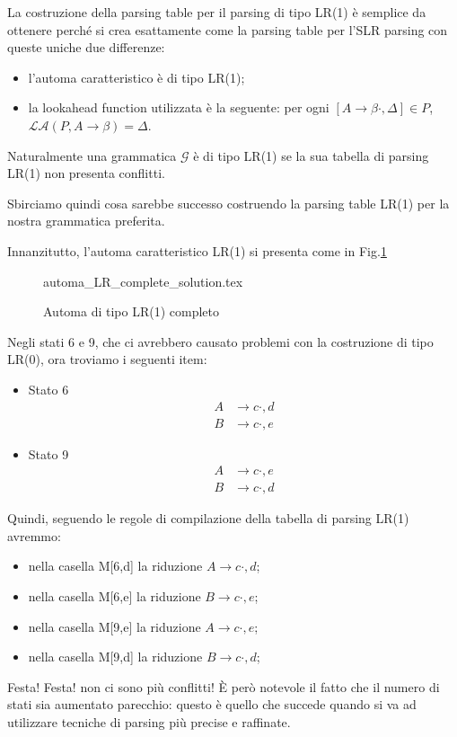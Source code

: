\documentclass[class=book, crop=false, oneside, 12pt]{standalone}
\begin{document}
La costruzione della parsing table per il parsing di tipo LR(1) è semplice da ottenere perché si crea esattamente come la parsing table per l'SLR parsing con queste uniche due differenze:
\begin{itemize}
    \item l'automa caratteristico è di tipo LR(1);
    \item la lookahead function utilizzata è la seguente: per ogni \([A \to \beta \cdot , \Delta] \in P\), \(\mathcal{LA}(P, A \to \beta ) = \Delta\).
\end{itemize}
Naturalmente una grammatica \(\mathcal{G}\) è di tipo LR(1) se la sua tabella di parsing LR(1) non presenta conflitti.

Sbirciamo quindi cosa sarebbe successo costruendo la parsing table LR(1) per la nostra grammatica preferita.

Innanzitutto, l'automa caratteristico LR(1) si presenta come in Fig.\ref{fig:lr1_automata-complete}
\begin{figure}[H]
    \centering
    {automa_LR_complete_solution.tex}
    \caption{Automa di tipo LR(1) completo}
    \label{fig:lr1_automata-complete}
\end{figure}
Negli stati 6 e 9, che ci avrebbero causato problemi con la costruzione di tipo LR(0), ora troviamo i seguenti item:
\begin{itemize}
    \item Stato 6
    \begin{align*}
        A &\to c \cdot , {d} \\
        B &\to c \cdot , {e}    
    \end{align*}
    \item Stato 9
    \begin{align*}
        A &\to c \cdot , {e} \\
        B &\to c \cdot , {d}    
    \end{align*}
\end{itemize}
 Quindi, seguendo le regole di compilazione della tabella di parsing LR(1) avremmo:
 \begin{itemize}
     \item nella casella M[6,d] la riduzione \(A \to c \cdot , {d}\);
     \item nella casella M[6,e] la riduzione \(B \to c \cdot , {e}\);
     \item nella casella M[9,e] la riduzione \(A \to c \cdot , {e}\);
     \item nella casella M[9,d] la riduzione \(B \to c \cdot , {d}\);
 \end{itemize}
Festa! Festa! non ci sono più conflitti!
È però notevole il fatto che il numero di stati sia aumentato parecchio: questo è quello che succede quando si va ad utilizzare tecniche di parsing più precise e raffinate.
\end{document}
